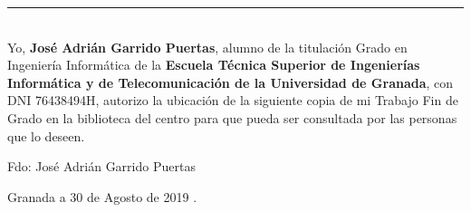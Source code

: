 \noindent\rule[-1ex]{\textwidth}{2pt}\\[4.5ex]

Yo, \textbf{José Adrián Garrido Puertas}, alumno de la titulación Grado en Ingeniería Informática de la \textbf{Escuela Técnica Superior
de Ingenierías Informática y de Telecomunicación de la Universidad de Granada}, con DNI 76438494H, autorizo la
ubicación de la siguiente copia de mi Trabajo Fin de Grado en la biblioteca del centro para que pueda ser
consultada por las personas que lo deseen.

\vspace{6cm}

\begin{flushright}
	\noindent Fdo: José Adrián Garrido Puertas
\end{flushright}

\begin{flushright}
	Granada a 30 de Agosto de 2019 .
\end{flushright}

\newpage 
